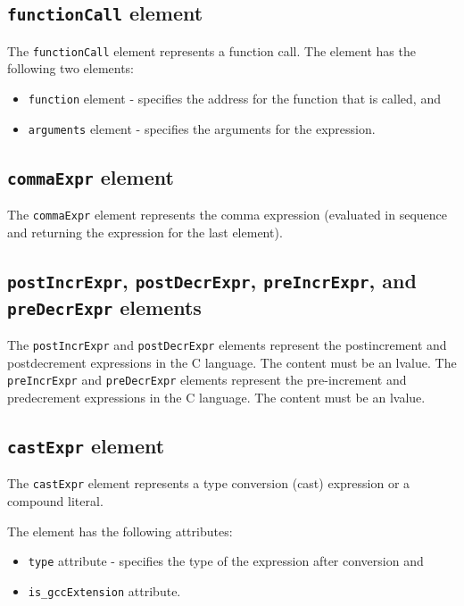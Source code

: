 \subsection{ {\tt functionCall} element}

The {\tt functionCall} element represents a function call. The element has the following two elements:

\begin{itemize}
\item {\tt function} element - specifies the address for the function that is called, and
\item {\tt arguments} element - specifies the arguments for the expression.
\end{itemize}


\subsection{ {\tt commaExpr} element}

The {\tt commaExpr} element represents the comma expression (evaluated in sequence and returning the expression for the last element).


\subsection{ {\tt postIncrExpr}, {\tt postDecrExpr}, {\tt preIncrExpr}, and {\tt preDecrExpr} elements}

The {\tt postIncrExpr} and {\tt postDecrExpr} elements represent the postincrement and postdecrement expressions in the C language. The content must be an lvalue. The {\tt preIncrExpr} and {\tt preDecrExpr} elements represent the pre-increment and predecrement expressions in the C language. The content must be an lvalue.


\subsection{ {\tt castExpr} element}

The {\tt castExpr} element represents a type conversion (cast) expression or a compound literal. 

The element has the following attributes:

\begin{itemize}
\item {\tt type} attribute - specifies the type of the expression after conversion and
\item {\tt is\_gccExtension} attribute.
\end{itemize}


